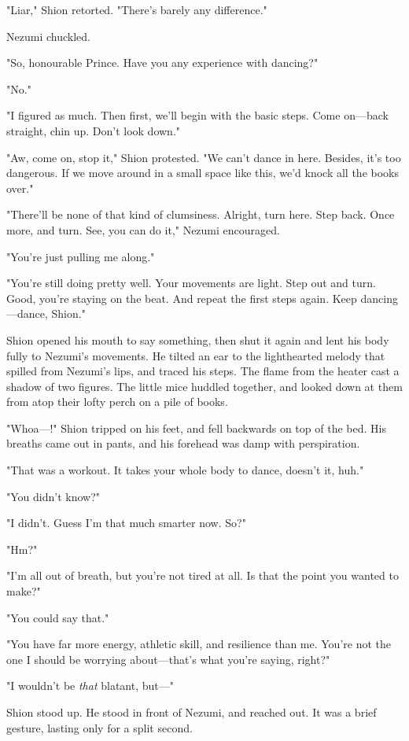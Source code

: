 "Liar," Shion retorted. "There's barely any difference."

Nezumi chuckled.

"So, honourable Prince. Have you any experience with dancing?"

"No."

"I figured as much. Then first, we'll begin with the basic steps. Come
on---back straight, chin up. Don't look down."

"Aw, come on, stop it," Shion protested. "We can't dance in here.
Besides, it's too dangerous. If we move around in a small space like
this, we'd knock all the books over."

"There'll be none of that kind of clumsiness. Alright, turn here. Step
back. Once more, and turn. See, you can do it," Nezumi encouraged.

"You're just pulling me along."

"You're still doing pretty well. Your movements are light. Step out and
turn. Good, you're staying on the beat. And repeat the first steps
again. Keep dancing---dance, Shion."

Shion opened his mouth to say something, then shut it again and lent his
body fully to Nezumi's movements. He tilted an ear to the lighthearted
melody that spilled from Nezumi's lips, and traced his steps. The flame
from the heater cast a shadow of two figures. The little mice huddled
together, and looked down at them from atop their lofty perch on a pile
of books.

"Whoa---!" Shion tripped on his feet, and fell backwards on top of the
bed. His breaths came out in pants, and his forehead was damp with
perspiration.

"That was a workout. It takes your whole body to dance, doesn't it,
huh."

"You didn't know?"

"I didn't. Guess I'm that much smarter now. So?"

"Hm?"

"I'm all out of breath, but you're not tired at all. Is that the point
you wanted to make?"

"You could say that."

"You have far more energy, athletic skill, and resilience than me.
You're not the one I should be worrying about---that's what you're saying,
right?"

"I wouldn't be \emph{that} blatant, but---"

Shion stood up. He stood in front of Nezumi, and reached out. It was a
brief gesture, lasting only for a split second.


